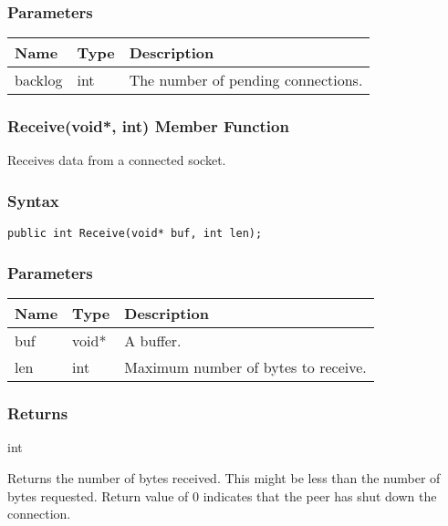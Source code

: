 \documentclass[a4paper,oneside,11.000000pt]{book}
\begin{document}
\subsubsection*{Parameters}
\begin{flushleft}
\begin{supertabular}[l]{lll}
\textbf{Name}
& \textbf{Type}
& \textbf{Description}
\\
\hline
backlog
& int
& The number of pending connections.

\\
\end{supertabular}

\end{flushleft}
\clearpage

\hypertarget{System.Net.Sockets.TcpSocket.Receive.P.System.Net.Sockets.TcpSocket.P.void.int}{\subsubsection*{Receive(void*, int) Member Function}}\begin{flushleft}
Receives data from a connected socket.

\end{flushleft}

\subsubsection*{Syntax}\texttt{public int Receive(void* buf, int len);}
\subsubsection*{Parameters}
\begin{flushleft}
\begin{supertabular}[l]{lll}
\textbf{Name}
& \textbf{Type}
& \textbf{Description}
\\
\hline
buf
& void*
& A buffer.

\\
len
& int
& Maximum number of bytes to receive.

\\
\end{supertabular}

\end{flushleft}
\subsubsection*{Returns}int
\begin{flushleft}
Returns the number of bytes received.
This might be less than the number of bytes requested.
Return value of 0 indicates that the peer has shut down the connection.

\end{flushleft}
\end{document}
